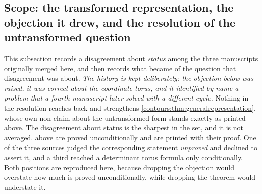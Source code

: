 \documentclass[11pt,letterpaper]{article}
\theoremstyle{definition}
\theoremstyle{remark}
\numberwithin{equation}{section}
\begin{document}
\subsection[Scope: the transformed representation, the objection, and the
resolution]{Scope: the transformed representation, the objection it drew, and the
resolution of the untransformed question}
\label{contours:subsec:scope}
This subsection records a disagreement about \emph{status} among the three
manuscripts originally merged here, and then records what became of the question
that disagreement was about. \emph{The history is kept deliberately: the
objection below was raised, it was correct about the coordinate torus, and it
identified by name a problem that a fourth manuscript later solved with a
different cycle.} Nothing in the resolution reaches back and strengthens
\cref{contours:thm:generalrepresentation}, whose own non-claim about the
untransformed form stands exactly as printed above. The disagreement about status
is the sharpest in the set, and it is not averaged.
 above are
proved unconditionally and are printed with their proof. One of the three sources
judged the corresponding statement \emph{unproved} and declined to assert it, and a
third reached a determinant torus formula only conditionally. Both positions are
reproduced here, because dropping the objection would overstate how much is proved
unconditionally, while dropping the theorem would understate it.
\end{document}
